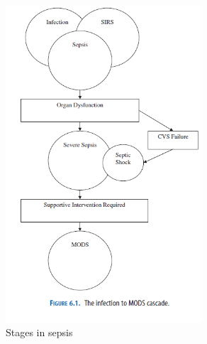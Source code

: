 \begin{figure}[H]
	\centering
	\includegraphics[width=0.65\textwidth]{figures/Sepsis_stages}
	\caption{Stages in sepsis}
	\label{fig:Sepsis_stages}
\end{figure} \vspace{-.3cm}

